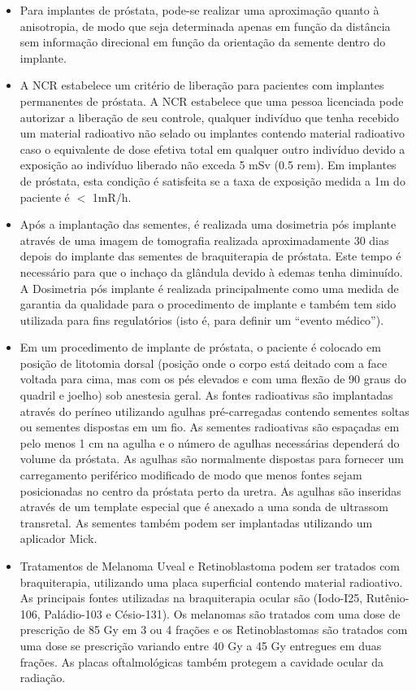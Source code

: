 \documentclass[11pt,a4paper]{article}
\newcounter{exemplo}
\begin{document}
\begin{exemplo}[Braquiterapia]
\begin{itemize}
        \item Para implantes de próstata, pode-se realizar uma aproximação quanto à anisotropia, de modo que seja determinada apenas em função da distância sem informação direcional em função da orientação da semente dentro do implante.
        
        \item A NCR estabelece um critério de liberação para pacientes com implantes permanentes de próstata. A NCR estabelece que uma pessoa licenciada pode autorizar a liberação de seu controle, qualquer indivíduo que tenha recebido um material radioativo não selado ou implantes contendo material radioativo caso o equivalente de dose efetiva total em qualquer outro indivíduo devido a exposição ao indivíduo liberado não exceda 5 mSv (0.5 rem). Em implantes de próstata, esta condição é satisfeita se a taxa de exposição medida a 1m do paciente é $<$ 1mR/h.

        \item Após a implantação das sementes, é realizada uma dosimetria pós implante através de uma imagem de tomografia realizada aproximadamente 30 dias depois do implante das sementes de braquiterapia de próstata. Este tempo é necessário para que o inchaço da glândula devido à edemas tenha diminuído. A Dosimetria pós implante é realizada principalmente como uma medida de garantia da qualidade para o procedimento de implante e também tem sido utilizada para fins regulatórios (isto é, para definir um ``evento médico'').
        
        \item Em um procedimento de implante de próstata, o paciente é colocado em posição de litotomia dorsal (posição onde o corpo está deitado com a face voltada para cima, mas com os pés elevados e com uma flexão de 90 graus do quadril e joelho) sob anestesia geral. As fontes radioativas são implantadas através do períneo utilizando agulhas pré-carregadas contendo sementes soltas ou sementes dispostas em um fio. As sementes radioativas são espaçadas em pelo menos 1 cm na agulha e o número de agulhas necessárias dependerá do volume da próstata. As agulhas são normalmente dispostas para fornecer um carregamento periférico modificado de modo que menos fontes sejam posicionadas no centro da próstata perto da uretra. As agulhas são inseridas através de um template especial que é anexado a uma sonda de ultrassom transretal. As sementes também podem ser implantadas utilizando um aplicador Mick.
        
        \item Tratamentos de Melanoma Uveal e Retinoblastoma podem ser tratados com braquiterapia, utilizando uma placa superficial contendo material radioativo. As principais fontes utilizadas na braquiterapia ocular são (Iodo-I25, Rutênio-106, Paládio-103 e Césio-131). Os melanomas são tratados com uma dose de prescrição de 85 Gy em 3 ou 4 frações e os Retinoblastomas são tratados com uma dose se prescrição variando entre 40 Gy a 45 Gy entregues em duas frações. As placas oftalmológicas também protegem a cavidade ocular da radiação. 
        

\end{itemize}
\end{exemplo}
\end{document}
